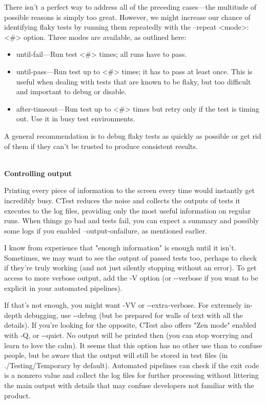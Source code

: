 There isn't a perfect way to address all of the preceding cases—the multitude of possible reasons is simply too great. However, we might increase our chance of identifying flaky tests by running them repeatedly with the –repeat <mode>:<\#> option. Three modes are available, as outlined here:

\begin{itemize}
\item 
until-fail—Run test <\#> times; all runs have to pass.

\item 
until-pass—Run test up to <\#> times; it has to pass at least once. This is useful when dealing with tests that are known to be flaky, but too difficult and important to debug or disable.

\item 
after-timeout—Run test up to <\#> times but retry only if the test is timing out. Use it in busy test environments.
\end{itemize}

A general recommendation is to debug flaky tests as quickly as possible or get rid of them if they can't be trusted to produce consistent results.

\hspace*{\fill} \\ %
\noindent
\textbf{Controlling output}

Printing every piece of information to the screen every time would instantly get incredibly busy. CTest reduces the noise and collects the outputs of tests it executes to the log files, providing only the most useful information on regular runs. When things go bad and tests fail, you can expect a summary and possibly some logs if you enabled --output-onfailure, as mentioned earlier.

I know from experience that "enough information" is enough until it isn't. Sometimes, we may want to see the output of passed tests too, perhaps to check if they're truly working (and not just silently stopping without an error). To get access to more verbose output, add the -V option (or -{}-verbose if you want to be explicit in your automated pipelines).

If that's not enough, you might want -VV or -{}-extra-verbose. For extremely in-depth debugging, use -{}-debug (but be prepared for walls of text with all the details). If you're looking for the opposite, CTest also offers "Zen mode" enabled with -Q, or -{}-quiet. No output will be printed then (you can stop worrying and learn to love the calm). It seems that this option has no other use than to confuse people, but be aware that the output will still be stored in test files (in ./Testing/Temporary by default). Automated pipelines can check if the exit code is a nonzero value and collect the log files for further processing without littering the main output with details that may confuse developers not familiar with the product.

